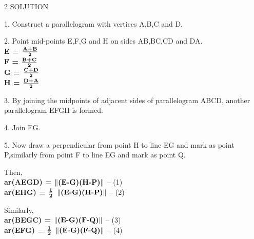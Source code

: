 \documentclass[a4paper,12pt]{report}
\begin{document}
\begin{multicols}{2}
\centering \large\textsc{2  S}\footnotesize\textsc{OLUTION}\vspace{5mm}\\
\raggedright\large{1. Construct a parallelogram with vertices A,B,C and D.}\\
\raggedright\large{2. Point mid-points E,F,G and H on sides AB,BC,CD and DA.}\vspace{5mm}\\
\hspace{2cm}\normalsize\textbf{E = $\frac{\normalsize\textbf {A+B}}{\normalsize\textbf 2}$}\vspace{2mm}\\
\hspace{2cm}\normalsize\textbf{F = $\frac{\normalsize\textbf{B+C}}{\normalsize\textbf 2}$}\vspace{2mm}\\
\hspace{2cm}\normalsize\textbf{G = $\frac{\normalsize\textbf {C+D}}{\normalsize\textbf 2}$}\vspace{2mm}\\
\hspace{2cm}\normalsize\textbf{H = $\frac{\normalsize\textbf {D+A}}{\normalsize\textbf 2}$}\vspace{5mm}\\
\raggedright\large{3. By joining the midpoints of adjacent sides of parallelogram ABCD, another parallelogram EFGH is formed.}\\
\raggedright\large{4. Join EG.}\\
\raggedright\large{5. Now draw a perpendicular from point H to line EG and mark as point P,similarly from point F to line EG and mark as point Q.}\vspace{5mm}\\


\raggedright\large{Then,}\vspace{2mm}\\
\centering\normalsize\textbf{ar(AEGD) = $ \| \normalsize\textbf{(E-G)(H-P)} \| $} -- (1)\vspace{2mm}\\
\centering\normalsize\textbf{ar(EHG) = $\frac{\normalsize\textbf 1}{\normalsize\textbf 2}$ $ \| \normalsize\textbf{(E-G)(H-P)} \| $} -- (2)\vspace{2mm}\\

\raggedright\large{Similarly,}\vspace{2mm}\\
\centering\normalsize\textbf{ar(BEGC) = $ \| \normalsize\textbf{(E-G)(F-Q)} \| $} -- (3)\vspace{2mm}\\
\centering\normalsize\textbf{ar(EFG) = $\frac{\normalsize\textbf 1}{\normalsize\textbf 2}$ $ \| \normalsize\textbf{(E-G)(F-Q)} \| $} -- (4)\vspace{5mm}\\


\end{multicols}
\end{document}
